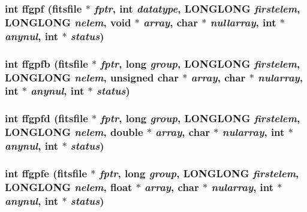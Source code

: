 \subsubsection{\setlength{\rightskip}{0pt plus 5cm}int ffgpf (\bf{fitsfile} $\ast$ {\em fptr}, int {\em datatype}, \bf{LONGLONG} {\em firstelem}, \bf{LONGLONG} {\em nelem}, void $\ast$ {\em array}, char $\ast$ {\em nullarray}, int $\ast$ {\em anynul}, int $\ast$ {\em status})}\label{fitsio__64_8h_fd98f4b7e140059770ec7fa0396a5b46}


\subsubsection{\setlength{\rightskip}{0pt plus 5cm}int ffgpfb (\bf{fitsfile} $\ast$ {\em fptr}, long {\em group}, \bf{LONGLONG} {\em firstelem}, \bf{LONGLONG} {\em nelem}, unsigned char $\ast$ {\em array}, char $\ast$ {\em nularray}, int $\ast$ {\em anynul}, int $\ast$ {\em status})}\label{fitsio__64_8h_b3ed324412e62cb24a95691ab0ab7bb1}


\subsubsection{\setlength{\rightskip}{0pt plus 5cm}int ffgpfd (\bf{fitsfile} $\ast$ {\em fptr}, long {\em group}, \bf{LONGLONG} {\em firstelem}, \bf{LONGLONG} {\em nelem}, double $\ast$ {\em array}, char $\ast$ {\em nularray}, int $\ast$ {\em anynul}, int $\ast$ {\em status})}\label{fitsio__64_8h_f07b2a21749be57deb75f5b64431f653}


\subsubsection{\setlength{\rightskip}{0pt plus 5cm}int ffgpfe (\bf{fitsfile} $\ast$ {\em fptr}, long {\em group}, \bf{LONGLONG} {\em firstelem}, \bf{LONGLONG} {\em nelem}, float $\ast$ {\em array}, char $\ast$ {\em nularray}, int $\ast$ {\em anynul}, int $\ast$ {\em status})}\label{fitsio__64_8h_1a079011790bd529d65496708911d743}


